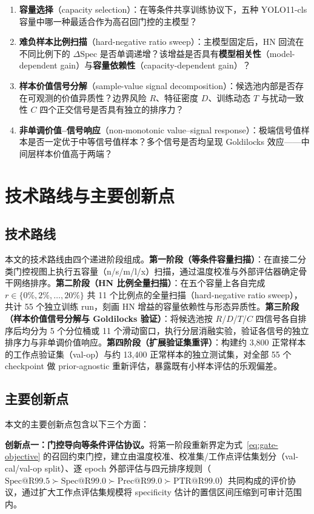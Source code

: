 \documentclass[UTF8,openany,12pt]{ctexbook}
\begin{document}
\begin{enumerate}[leftmargin=2em,nosep]
\item \textbf{容量选择}（capacity selection）：在等条件共享训练协议下，五种 YOLO11-cls 容量中哪一种最适合作为高召回门控的主模型？
\item \textbf{难负样本比例扫描}（hard-negative ratio sweep）：主模型固定后，HN 回流在不同比例下的 $\Delta\mathrm{Spec}$ 是否单调递增？该增益是否具有\textbf{模型相关性}（model-dependent gain）与\textbf{容量依赖性}（capacity-dependent gain）？
\item \textbf{样本价值信号分解}（sample-value signal decomposition）：候选池内部是否存在可观测的价值异质性？边界风险 $R$、特征密度 $D$、训练动态 $T$ 与扰动一致性 $C$ 四个正交信号是否具有独立的排序力？
\item \textbf{非单调价值--信号响应}（non-monotonic value--signal response）：极端信号值样本是否一定优于中等信号值样本？多个信号是否均呈现 Goldilocks 效应——中间层样本价值高于两端？
\end{enumerate}

\section{技术路线与主要创新点}

\subsection{技术路线}
本文的技术路线由四个递进阶段组成。\textbf{第一阶段（等条件容量扫描）}：在直接二分类门控视图上执行五容量（n/s/m/l/x）扫描，通过温度校准与外部评估器确定骨干网络排序。\textbf{第二阶段（HN 比例全量扫描）}：在五个容量上各自完成 $r \in \{0\%,2\%,\ldots,20\%\}$ 共 11 个比例点的全量扫描（hard-negative ratio sweep），共计 55 个独立训练 run，刻画 HN 增益的容量依赖性与形态异质性。\textbf{第三阶段（样本价值信号分解与 Goldilocks 验证）}：将候选池按 $R$/$D$/$T$/$C$ 四信号各自排序后均分为 5 个分位桶或 11 个滑动窗口，执行分层消融实验，验证各信号的独立排序力与非单调价值响应。\textbf{第四阶段（扩展验证集重评）}：构建约 3{,}800 正常样本的工作点验证集（val-op）与约 13{,}400 正常样本的独立测试集，对全部 55 个 checkpoint 做 prior-agnostic 重新评估，暴露既有小样本评估的乐观偏差。

\subsection{主要创新点}
本文的主要创新点包含以下三个方面：

\noindent\textbf{创新点一：门控导向等条件评估协议。}将第一阶段重新界定为式~\eqref{eq:gate-objective} 的召回约束门控，建立由温度校准\cite{guo2017calibration}、校准集/工作点评估集划分（val-cal/val-op split）、逐 epoch 外部评估与四元排序规则（$\mathrm{Spec@R99.5} \succ \mathrm{Spec@R99.0} \succ \mathrm{Prec@R99.0} \succ \mathrm{PTR@R99.0}$）共同构成的评价协议，通过扩大工作点评估集规模将 specificity 估计的置信区间压缩到可审计范围内。
\end{document}
